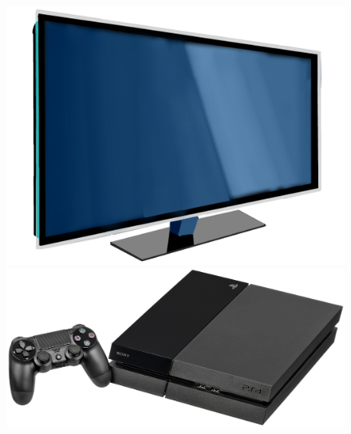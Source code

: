 \documentclass[aspectratio=169]{beamer}
\begin{document}
\begin{frame}
\begin{columns}
\begin{figure}
      \includegraphics[scale=0.07]{images/tv.png}
      \includegraphics[scale=0.2]{images/game-console.jpg}

\end{figure}
\end{columns}
\end{frame}
\end{document}
